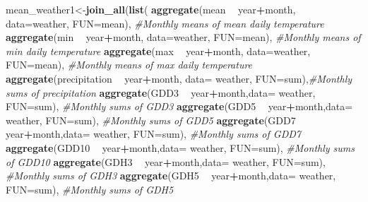 \documentclass[10pt,]{article}
\newenvironment{Shaded}{\begin{snugshade}}{\end{snugshade}}
\newcommand{\KeywordTok}[1]{\textcolor[rgb]{0.13,0.29,0.53}{\textbf{#1}}}
\newcommand{\DataTypeTok}[1]{\textcolor[rgb]{0.13,0.29,0.53}{#1}}
\newcommand{\StringTok}[1]{\textcolor[rgb]{0.31,0.60,0.02}{#1}}
\newcommand{\CommentTok}[1]{\textcolor[rgb]{0.56,0.35,0.01}{\textit{#1}}}
\newcommand{\OperatorTok}[1]{\textcolor[rgb]{0.81,0.36,0.00}{\textbf{#1}}}
\newcommand{\NormalTok}[1]{#1}
\begin{document}
\begin{Shaded}
\begin{Highlighting}[]
\NormalTok{mean_weather1<-}\KeywordTok{join_all}\NormalTok{(}\KeywordTok{list}\NormalTok{(}
    \KeywordTok{aggregate}\NormalTok{(mean }\OperatorTok{~}\StringTok{ }\NormalTok{year}\OperatorTok{+}\NormalTok{month, }\DataTypeTok{data=}\NormalTok{weather, }\DataTypeTok{FUN=}\NormalTok{mean), }\CommentTok{#Monthly means of mean daily temperature}
    \KeywordTok{aggregate}\NormalTok{(min }\OperatorTok{~}\StringTok{ }\NormalTok{year}\OperatorTok{+}\NormalTok{month, }\DataTypeTok{data=}\NormalTok{weather, }\DataTypeTok{FUN=}\NormalTok{mean), }\CommentTok{#Monthly means of min daily temperature}
    \KeywordTok{aggregate}\NormalTok{(max }\OperatorTok{~}\StringTok{ }\NormalTok{year}\OperatorTok{+}\NormalTok{month, }\DataTypeTok{data=}\NormalTok{weather, }\DataTypeTok{FUN=}\NormalTok{mean), }\CommentTok{#Monthly means of max daily temperature}
    \KeywordTok{aggregate}\NormalTok{(precipitation }\OperatorTok{~}\StringTok{ }\NormalTok{year}\OperatorTok{+}\NormalTok{month, }\DataTypeTok{data=}\NormalTok{ weather, }\DataTypeTok{FUN=}\NormalTok{sum),}\CommentTok{#Monthly sums of precipitation}
    \KeywordTok{aggregate}\NormalTok{(GDD3 }\OperatorTok{~}\StringTok{ }\NormalTok{year}\OperatorTok{+}\NormalTok{month,}\DataTypeTok{data=}\NormalTok{ weather, }\DataTypeTok{FUN=}\NormalTok{sum),          }\CommentTok{#Monthly sums of GDD3}
    \KeywordTok{aggregate}\NormalTok{(GDD5 }\OperatorTok{~}\StringTok{ }\NormalTok{year}\OperatorTok{+}\NormalTok{month,}\DataTypeTok{data=}\NormalTok{ weather, }\DataTypeTok{FUN=}\NormalTok{sum),          }\CommentTok{#Monthly sums of GDD5}
    \KeywordTok{aggregate}\NormalTok{(GDD7 }\OperatorTok{~}\StringTok{ }\NormalTok{year}\OperatorTok{+}\NormalTok{month,}\DataTypeTok{data=}\NormalTok{ weather, }\DataTypeTok{FUN=}\NormalTok{sum),          }\CommentTok{#Monthly sums of GDD7}
    \KeywordTok{aggregate}\NormalTok{(GDD10 }\OperatorTok{~}\StringTok{ }\NormalTok{year}\OperatorTok{+}\NormalTok{month,}\DataTypeTok{data=}\NormalTok{ weather, }\DataTypeTok{FUN=}\NormalTok{sum),         }\CommentTok{#Monthly sums of GDD10}
    \KeywordTok{aggregate}\NormalTok{(GDH3 }\OperatorTok{~}\StringTok{ }\NormalTok{year}\OperatorTok{+}\NormalTok{month,}\DataTypeTok{data=}\NormalTok{ weather, }\DataTypeTok{FUN=}\NormalTok{sum),          }\CommentTok{#Monthly sums of GDH3}
    \KeywordTok{aggregate}\NormalTok{(GDH5 }\OperatorTok{~}\StringTok{ }\NormalTok{year}\OperatorTok{+}\NormalTok{month,}\DataTypeTok{data=}\NormalTok{ weather, }\DataTypeTok{FUN=}\NormalTok{sum),          }\CommentTok{#Monthly sums of GDH5}

\end{Highlighting}
\end{Shaded}
\end{document}
